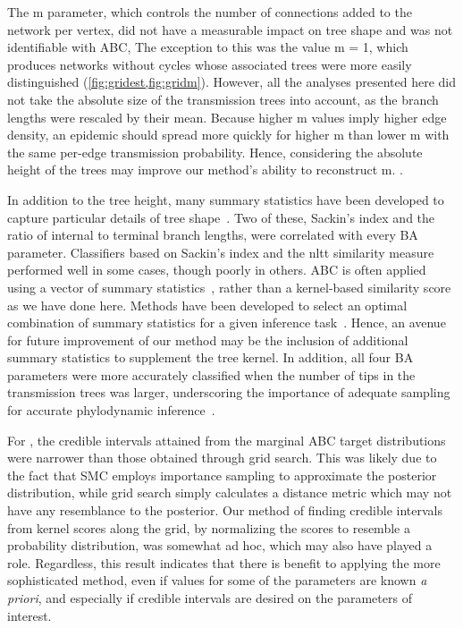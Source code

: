 The \gls{m} parameter, which controls the number of connections added to the
network per vertex, did not have a measurable impact on tree shape and was not
identifiable with \gls{ABC},  The exception to this was the value \gls{m} = 1,
which produces networks without cycles whose associated trees were more easily
distinguished (\cref{fig:gridest,fig:gridm}). However, all the analyses
presented here did not take the absolute size of the transmission trees into
account, as the branch lengths were rescaled by their mean. Because higher
\gls{m} values imply higher edge density, an epidemic should spread more
quickly for higher \gls{m} than lower \gls{m} with the same per-edge
transmission probability.  Hence, considering the absolute height of the trees
may improve our method's ability to reconstruct \gls{m}. .

In addition to the tree height, many summary statistics have been developed to
capture particular details of tree shape~\autocite{bortolussi2006aptreeshape}.
Two of these, Sackin's index and the ratio of internal to terminal branch
lengths, were correlated with every \gls{BA} parameter. Classifiers based on
Sackin's index and the \gls{nltt} similarity measure performed well in some
cases, though poorly in others. \Gls{ABC} is often applied using a vector of
summary statistics~\autocite{marin2012approximate, sunnaaker2013approximate},
rather than a kernel-based similarity score as we have done here. Methods have
been developed to select an optimal combination of summary statistics for a
given inference task~\autocite{fearnhead2012constructing}. Hence, an avenue for
future improvement of our method may be the inclusion of additional summary
statistics to supplement the tree kernel. In addition, all four \gls{BA}
parameters were more accurately classified when the number of tips in the
transmission trees was larger, underscoring the importance of adequate sampling
for accurate phylodynamic inference~\autocite{novitsky2014impact}.

For , the
credible intervals attained from the marginal \gls{ABC} target distributions
were  narrower than those obtained through grid search. This was likely due to the fact
that \gls{SMC} employs importance sampling to approximate the posterior
distribution, while grid search simply calculates a distance metric which may
not have any resemblance to the posterior. Our method of finding credible
intervals from kernel scores along the grid, by normalizing the scores to
resemble a probability distribution, was somewhat ad hoc, which may also have
played a role. Regardless, this result indicates that there is benefit to
applying the more sophisticated method, even if values for some of the
parameters are known \textit{a priori}, and especially if credible intervals
are desired on the parameters of interest.

